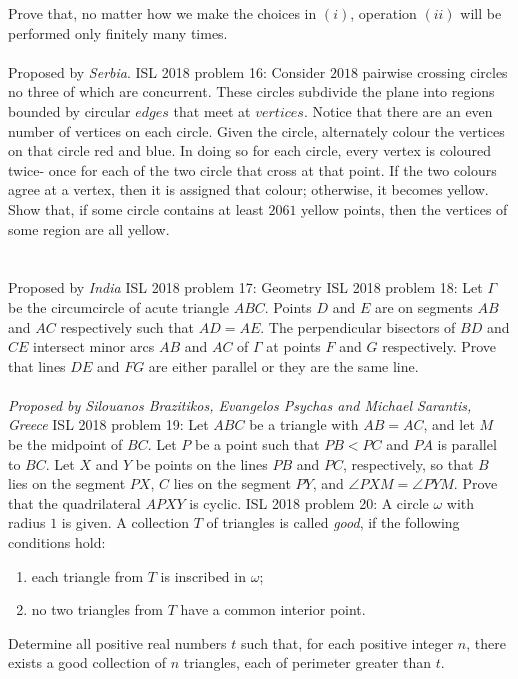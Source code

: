 Prove that, no matter how we make the choices in $(i)$, operation $(ii)$ will be performed only finitely many times. \\\\
Proposed by \textit{Serbia}. 
ISL 2018 problem 16:  Consider $2018$ pairwise crossing circles no three of which are concurrent. These circles subdivide the plane into regions bounded by circular $edges$ that meet at $vertices$. Notice that there are an even number of vertices on each circle. Given the circle, alternately colour the vertices on that circle red and blue. In doing so for each circle, every vertex is coloured twice- once for each of the two circle that cross at that point. If the two colours agree at a vertex, then it is assigned that colour; otherwise, it becomes yellow. Show that, if some circle contains at least $2061$ yellow points, then the vertices of some region are all yellow. \\\\\\
Proposed by \textit{India} 
ISL 2018 problem 17:  Geometry 
ISL 2018 problem 18:  Let $\Gamma$ be the circumcircle of acute triangle $ABC$. Points $D$ and $E$ are on segments $AB$ and $AC$ respectively such that $AD = AE$. The perpendicular bisectors of $BD$ and $CE$ intersect minor arcs $AB$ and $AC$ of $\Gamma$ at points $F$ and $G$ respectively. Prove that lines $DE$ and $FG$ are either parallel or they are the same line. \\\\
\textit{Proposed by Silouanos Brazitikos, Evangelos Psychas and Michael Sarantis, Greece} 
ISL 2018 problem 19:  Let $ABC$ be a triangle with $AB=AC$, and let $M$ be the midpoint of $BC$. Let $P$ be a point such that $PB<PC$ and $PA$ is parallel to $BC$. Let $X$ and $Y$ be points on the lines $PB$ and $PC$, respectively, so that $B$ lies on the segment $PX$, $C$ lies on the segment $PY$, and $\angle PXM=\angle PYM$. Prove that the quadrilateral $APXY$ is cyclic. 
ISL 2018 problem 20:  A circle $\omega$ with radius $1$ is given. A collection $T$ of triangles is called \textit{good}, if the following conditions hold:
\begin{enumerate}
  \item each triangle from $T$ is inscribed in $\omega$;
  \item no two triangles from $T$ have a common interior point.
\end{enumerate}
Determine all positive real numbers $t$ such that, for each positive integer $n$, there exists a good collection of $n$ triangles, each of perimeter greater than $t$. 
